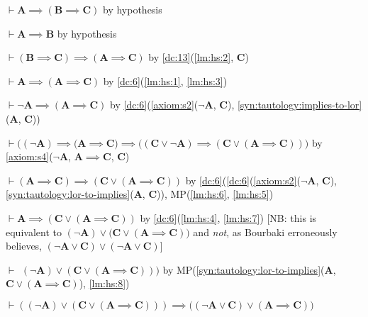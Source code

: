 \documentclass{amsart}%
\newcommand\metavariable[1]{\boldsymbol{#1}}
\begin{document}
\begin{pf}
\item\label{lm:hs:1} $\vdash\metavariable{A}\implies(\metavariable{B}\implies\metavariable{C})$
  by hypothesis
\item\label{lm:hs:2} $\vdash\metavariable{A}\implies\metavariable{B}$
  by hypothesis
\item\label{lm:hs:3} $\vdash(\metavariable{B}\implies\metavariable{C})\implies(\metavariable{A}\implies\metavariable{C})$
  by \ref{dc:13}(\ref{lm:hs:2}, $\metavariable{C}$)
\item\label{lm:hs:4} $\vdash\metavariable{A}\implies(\metavariable{A}\implies\metavariable{C})$
  by \ref{dc:6}(\ref{lm:hs:1}, \ref{lm:hs:3})
\item\label{lm:hs:5} $\vdash\neg\metavariable{A}\implies(\metavariable{A}\implies\metavariable{C})$
  by \ref{dc:6}(\ref{axiom:s2}($\neg\metavariable{A}$, $\metavariable{C}$),
  \ref{syn:tautology:implies-to-lor}($\metavariable{A}$, $\metavariable{C}$))
\item\label{lm:hs:6} $\vdash\bigl((\neg\metavariable{A})\implies(\metavariable{A}\implies\metavariable{C}\bigr)\implies\bigl((\metavariable{C}\lor\neg\metavariable{A})\implies(\metavariable{C}\lor(\metavariable{A}\implies\metavariable{C}))\bigr)$
  by \ref{axiom:s4}($\neg\metavariable{A}$, $\metavariable{A}\implies\metavariable{C}$, $\metavariable{C}$)
\item\label{lm:hs:7} $\vdash(\metavariable{A}\implies\metavariable{C})\implies(\metavariable{C}\lor(\metavariable{A}\implies\metavariable{C}))$
  by \ref{dc:6}(\ref{dc:6}(\ref{axiom:s2}($\neg\metavariable{A}$, $\metavariable{C}$),
  \ref{syn:tautology:lor-to-implies}($\metavariable{A}$, $\metavariable{C}$)),
  MP(\ref{lm:hs:6}, \ref{lm:hs:5})
\item\label{lm:hs:8} $\vdash\metavariable{A}\implies(\metavariable{C}\lor(\metavariable{A}\implies\metavariable{C}))$
  by \ref{dc:6}(\ref{lm:hs:4}, \ref{lm:hs:7})
[NB: this is equivalent to $(\neg\metavariable{A})\lor\bigl(\metavariable{C}\lor(\metavariable{A}\implies\metavariable{C})\bigr)$
and \emph{not}, as Bourbaki erroneously believes, $(\neg\metavariable{A}\lor\metavariable{C})\lor(\neg\metavariable{A}\lor\metavariable{C})$]
\item\label{lm:hs:9} $\vdash\phantom{(}(\neg\metavariable{A})\lor(\metavariable{C}\lor(\metavariable{A}\implies\metavariable{C})))$
  by MP(\ref{syn:tautology:lor-to-implies}($\metavariable{A}$, $\metavariable{C}\lor(\metavariable{A}\implies\metavariable{C})$), \ref{lm:hs:8})
\item\label{lm:hs:10} $\vdash((\neg\metavariable{A})\lor(\metavariable{C}\lor(\metavariable{A}\implies\metavariable{C})))\implies\bigl((\neg\metavariable{A}\lor\metavariable{C})\lor(\metavariable{A}\implies\metavariable{C})\bigr)$

\end{pf}
\end{document}
